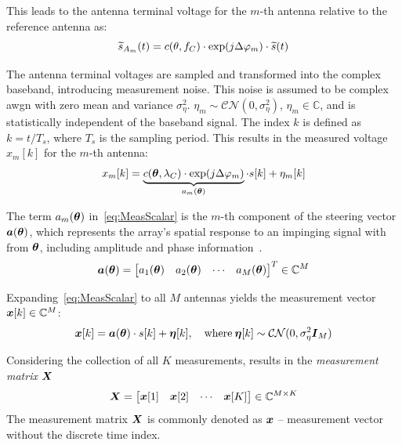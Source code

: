 This leads to the antenna terminal voltage for the \( m \)-th antenna relative to the reference antenna as:
\begin{equation}
    \widetilde{s}_{A_m}(t) = c(\theta,f_C) \cdot \exp(j\Delta\varphi_m) \cdot \widetilde{s}(t)                \\
\end{equation}

The antenna terminal voltages are sampled and transformed into the complex baseband, introducing measurement noise. %
This noise is assumed to be complex \gls{awgn} with zero mean and variance \( \sigma_\eta^2 \).
\( \eta_m \sim \mathcal{C}\mathcal{N}(0,\sigma_\eta^2) \), \( \eta_m \in \mathbb{C} \), and is statistically independent of the
baseband signal. The index \( k \) is defined as \( k = t / T_s \), where \( T_s \) is the sampling period.
This results in the measured voltage \( x_m[k] \) for the \( m \)-th antenna:
\begin{equation}
    x_m[k] = \underbrace{c(\boldsymbol{\theta},\lambda_C) \cdot \exp(j\Delta\varphi_m)}_{a_m(\boldsymbol{\theta})} \cdot s[k] + \eta_m[k]
    \label{eq:MeasScalar}
\end{equation}

The term \( a_m(\boldsymbol{\theta}) \) in~\eqref{eq:MeasScalar} is the \( m \)-th component of the steering vector \( \boldsymbol{a}(\boldsymbol{\theta}) \),
which represents the array's spatial response to an impinging signal with from \( \boldsymbol{\theta} \), including amplitude
and phase information~\cite{oap.ch9}.
\begin{equation}
    \boldsymbol{a}(\boldsymbol{\theta}) =
    \begin{bmatrix} a_1(\boldsymbol{\theta}) & a_2(\boldsymbol{\theta}) & \cdots & a_M(\boldsymbol{\theta}) \end{bmatrix}^T \in \mathbb{C}^{M}
    \label{eq:SteeringVector}
\end{equation}

Expanding~\eqref{eq:MeasScalar} to all \( M \) antennas yields the measurement vector \( \boldsymbol{x}[k] \in \mathbb{C}^{M} \):
\begin{equation}
    \boldsymbol{x}[k] = \boldsymbol{a}(\boldsymbol{\theta}) \cdot s[k] + \boldsymbol{\eta}[k],\quad \text{where}\: \boldsymbol{\eta}[k] \sim \mathcal{C}\mathcal{N}(0,\sigma_\eta^2 \boldsymbol{I}_M)
    \label{eq:MeasVecSingle}
\end{equation}

Considering the collection of all \( K \) measurements, results in the \textit{measurement matrix} \( \boldsymbol{X} \)
\begin{equation}
    \boldsymbol{X} = \begin{bmatrix} \boldsymbol{x}[1] & \boldsymbol{x}[2] & \cdots & \boldsymbol{x}[K] \end{bmatrix} \in \mathbb{C}^{M \times K}
    \label{eq:MeasMatSingle}
\end{equation}
The measurement matrix \( \boldsymbol{X} \) is commonly denoted as \( \boldsymbol{x} \) -- measurement vector without the discrete time index.

